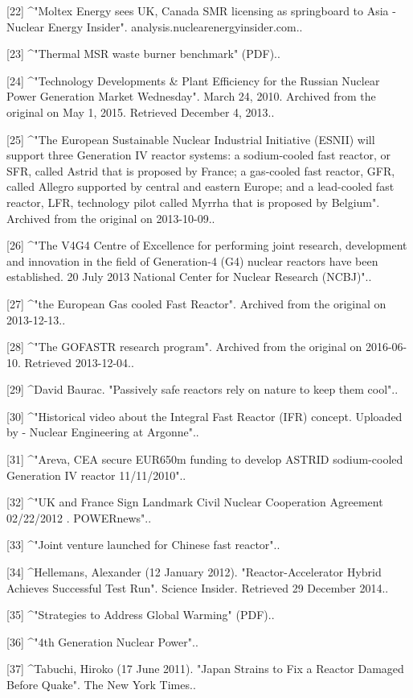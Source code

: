 [22]
^"Moltex Energy sees UK, Canada SMR licensing as springboard to Asia - Nuclear Energy Insider". analysis.nuclearenergyinsider.com..

[23]
^"Thermal MSR waste burner benchmark" (PDF)..

[24]
^"Technology Developments & Plant Efficiency for the Russian Nuclear Power Generation Market Wednesday". March 24, 2010. Archived from the original on May 1, 2015. Retrieved December 4, 2013..

[25]
^"The European Sustainable Nuclear Industrial Initiative (ESNII) will support three Generation IV reactor systems: a sodium-cooled fast reactor, or SFR, called Astrid that is proposed by France; a gas-cooled fast reactor, GFR, called Allegro supported by central and eastern Europe; and a lead-cooled fast reactor, LFR, technology pilot called Myrrha that is proposed by Belgium". Archived from the original on 2013-10-09..

[26]
^"The V4G4 Centre of Excellence for performing joint research, development and innovation in the field of Generation-4 (G4) nuclear reactors have been established. 20 July 2013 National Center for Nuclear Research (NCBJ)"..

[27]
^"the European Gas cooled Fast Reactor". Archived from the original on 2013-12-13..

[28]
^"The GOFASTR research program". Archived from the original on 2016-06-10. Retrieved 2013-12-04..

[29]
^David Baurac. "Passively safe reactors rely on nature to keep them cool"..

[30]
^"Historical video about the Integral Fast Reactor (IFR) concept. Uploaded by - Nuclear Engineering at Argonne"..

[31]
^"Areva, CEA secure EUR650m funding to develop ASTRID sodium-cooled Generation IV reactor 11/11/2010"..

[32]
^"UK and France Sign Landmark Civil Nuclear Cooperation Agreement 02/22/2012 . POWERnews"..

[33]
^"Joint venture launched for Chinese fast reactor"..

[34]
^Hellemans, Alexander (12 January 2012). "Reactor-Accelerator Hybrid Achieves Successful Test Run". Science Insider. Retrieved 29 December 2014..

[35]
^"Strategies to Address Global Warming" (PDF)..

[36]
^"4th Generation Nuclear Power"..

[37]
^Tabuchi, Hiroko (17 June 2011). "Japan Strains to Fix a Reactor Damaged Before Quake". The New York Times..

